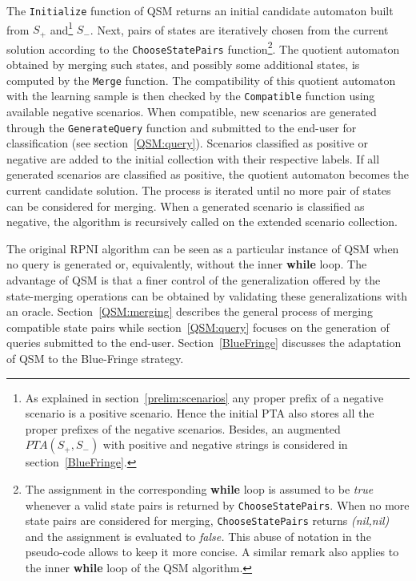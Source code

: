 The \texttt{Initialize} function of \textsc{QSM} returns an initial candidate automaton built from $S_+$ and\footnote{As explained in section~\ref{prelim:scenarios} any proper prefix of a negative scenario is a positive scenario. Hence the initial PTA also stores all the proper prefixes of the negative scenarios. Besides, an augmented $PTA(S_+,S_-)$ with positive and negative strings is considered in section~\ref{BlueFringe}.} $S_-$. Next, pairs of states are iteratively chosen from the current solution according to the \texttt{ChooseStatePairs} function\footnote{The assignment in the corresponding \textbf{while} loop is assumed to be \textit{true} whenever a valid state pairs is returned by \texttt{ChooseStatePairs}. When no more state pairs are considered for merging, \texttt{ChooseStatePairs} returns \textit{(nil,nil)} and the assignment is evaluated to \textit{false.} This abuse of notation in the pseudo-code allows to keep it more concise. A similar remark also applies to the inner \textbf{while} loop of the \textsc{QSM} algorithm.}. The quotient automaton obtained by merging such states, and possibly some additional states, is computed by the \texttt{Merge} function. The compatibility of this quotient automaton with the learning sample is then checked by the \texttt{Compatible} function using available negative scenarios. When compatible, new scenarios are generated through the \texttt{GenerateQuery} function and submitted to the end-user for classification (see section~\ref{QSM:query}). Scenarios classified as positive or negative are added to the initial collection with their respective labels. If all generated scenarios are classified as positive, the quotient automaton becomes the current candidate solution. The process is iterated until no more pair of states can be considered for merging. When a generated scenario is classified as negative, the algorithm is recursively called on the extended scenario collection.

The original RPNI algorithm can be seen as a particular instance of \textsc{QSM} when no query is generated or, equivalently, without the inner \textbf{while} loop. The advantage of \textsc{QSM} is that a finer control of the generalization offered by the state-merging operations can be obtained by validating these generalizations with an oracle. Section~\ref{QSM:merging} describes the general process of merging compatible state pairs while section~\ref{QSM:query} focuses on the generation of queries submitted to the end-user. Section~\ref{BlueFringe} discusses the adaptation of \textsc{QSM} to the Blue-Fringe strategy.

